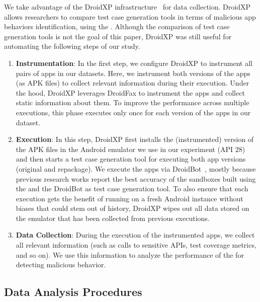 We take advantage of the DroidXP infrastructure~\cite{DBLP:conf/scam/CostaMCMVBC20}
for data collection. DroidXP allows researchers to compare 
test case generation tools in terms of malicious app behaviors identification, using the \mas. Although the comparison of test
case generation tools is not the goal of this paper, DroidXP
was still useful for automating the following steps of our study.


\begin{enumerate}[S1]
 \item \textbf{Instrumentation}: In the first step,
we configure DroidXP to instrument all pairs of apps in our datasets.
Here, we instrument both versions of the apps (as APK files) to collect relevant information during their execution. Under the hood, DroidXP leverages
DroidFax to instrument the apps and collect static
information about them. To improve the performance across multiple executions,
this phase executes only once for each version of the apps in our dataset.

\item \textbf{Execution}: In this step, DroidXP first installs the (instrumented) version of the APK files in the Android emulator we use in our experiment (API 28) and then starts a test case generation tool for executing both app versions (original and repackage). We execute the apps via DroidBot~\cite{DBLP:conf/icse/LiYGC17}, mostly because previous research works report the best accuracy of the sandboxes built using the \mas and the DroidBot as test case generation tool. To also ensure that each execution gets the benefit of running on a fresh Android instance without biases that could stem out of history, DroidXP wipes out all data stored on the emulator that has been collected from previous executions.


\item \textbf{Data Collection}: During the execution of the instrumented apps, we collect all relevant information (such as calls to sensitive APIs, test coverage metrics, and so on). We use this information to analyze the performance of the \mas for detecting malicious behavior.
\end{enumerate}

\subsection{Data Analysis Procedures} \label{sec:dataAnalysisProc}



